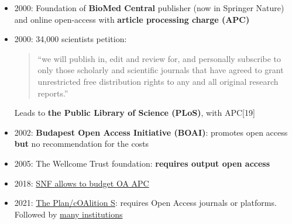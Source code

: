 \documentclass[10pt,compress,serif,aspectratio=169]{beamer}
\begin{document}
 \begin{frame}[t]%
 \vskip1cm%
\begin{itemize}

\item 2000: Foundation of \textbf{BioMed Central} publisher (now in Springer Nature) and online open-access with \textbf{article processing charge (APC)}
\item 2000: 34,000 scientists petition:
  \begin{quote}
    “we will publish in, edit and review for, and personally subscribe to only those scholarly and scientific journals that have agreed to grant unrestricted free distribution rights to any and all original research reports.”
  \end{quote}
  Leads to \textbf{the Public Library of Science (PLoS)}, with APC[19]

  \item 2002: \textbf{Budapest Open Access Initiative (BOAI)}: promotes open access \textbf{but} no recommendation for the costs
  \item 2005: The Wellcome Trust foundation: \textbf{requires output open access}
  \item 2018: \href{https://www.snf.ch/en/bQ17hb9mM1NC4awy/news/news-181010-make-open-access-the-new-normal}{SNF allows to budget OA APC}
  \item 2021: \href{https://www.coalition-s.org/}{The Plan/cOAlition S}: requires Open Access journals or platforms. Followed by \href{https://www.coalition-s.org/supporters/}{many institutions}
 \end{itemize}
\end{frame}
\end{document}
